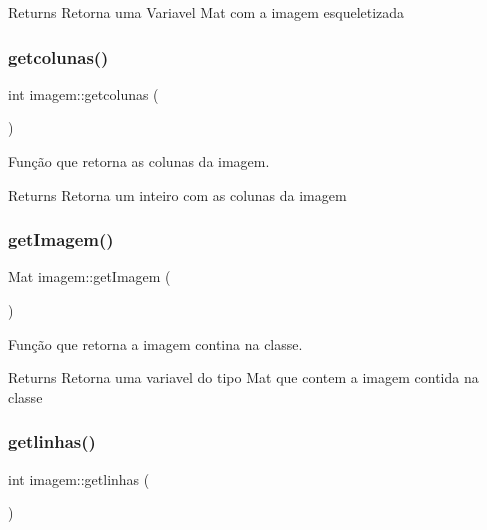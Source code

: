 \begin{DoxyReturn}{Returns}
Retorna uma Variavel Mat com a imagem esqueletizada 
\end{DoxyReturn}
\mbox{\label{classimagem_a561c2829106e5df33e62b4cb3c9ceac1}} 
\subsubsection{\texorpdfstring{getcolunas()}{getcolunas()}}
{\footnotesize\ttfamily int imagem\+::getcolunas (\begin{DoxyParamCaption}{ }\end{DoxyParamCaption})}



Função que retorna as colunas da imagem. 

\begin{DoxyReturn}{Returns}
Retorna um inteiro com as colunas da imagem 
\end{DoxyReturn}
\mbox{\label{classimagem_ae86c0f56ad56fb4cc9f0a9020fc856d4}} 
\subsubsection{\texorpdfstring{get\+Imagem()}{getImagem()}}
{\footnotesize\ttfamily Mat imagem\+::get\+Imagem (\begin{DoxyParamCaption}{ }\end{DoxyParamCaption})}



Função que retorna a imagem contina na classe. 

\begin{DoxyReturn}{Returns}
Retorna uma variavel do tipo Mat que contem a imagem contida na classe 
\end{DoxyReturn}
\mbox{\label{classimagem_ae87ae55ee13fbfe25158eed459af857f}} 
\subsubsection{\texorpdfstring{getlinhas()}{getlinhas()}}
{\footnotesize\ttfamily int imagem\+::getlinhas (\begin{DoxyParamCaption}{ }\end{DoxyParamCaption})}



